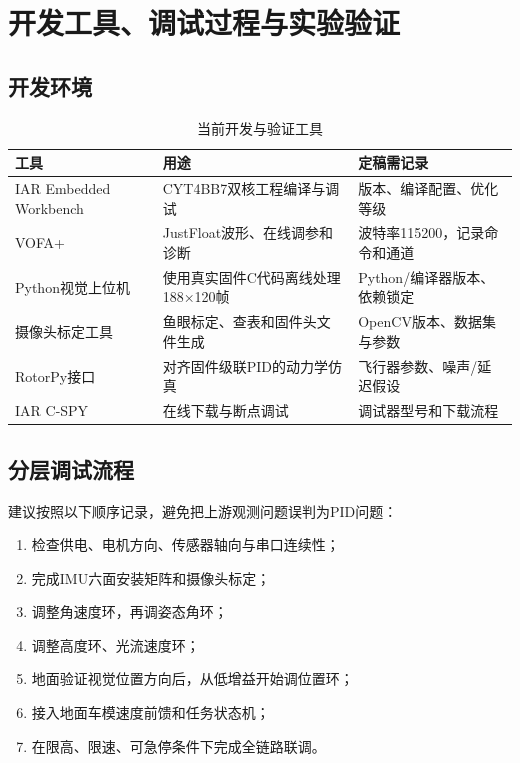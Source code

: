 \chapter{开发工具、调试过程与实验验证}

\section{开发环境}

\begin{table}[htbp]
  \centering
  \caption{当前开发与验证工具}
  \begin{tabularx}{\textwidth}{p{3.2cm}p{4.1cm}X}
    \toprule
    工具 & 用途 & 定稿需记录 \\
    \midrule
    IAR Embedded Workbench & CYT4BB7双核工程编译与调试 & 版本、编译配置、优化等级 \\
    VOFA+ & JustFloat波形、在线调参和诊断 & 波特率115200，记录命令和通道 \\
    Python视觉上位机 & 使用真实固件C代码离线处理188×120帧 & Python/编译器版本、依赖锁定 \\
    摄像头标定工具 & 鱼眼标定、查表和固件头文件生成 & OpenCV版本、数据集与参数 \\
    RotorPy接口 & 对齐固件级联PID的动力学仿真 & 飞行器参数、噪声/延迟假设 \\
    IAR C-SPY & 在线下载与断点调试 & 调试器型号和下载流程 \\
    \bottomrule
  \end{tabularx}
\end{table}

\section{分层调试流程}

建议按照以下顺序记录，避免把上游观测问题误判为PID问题：
\begin{enumerate}
  \item 检查供电、电机方向、传感器轴向与串口连续性；
  \item 完成IMU六面安装矩阵和摄像头标定；
  \item 调整角速度环，再调姿态角环；
  \item 调整高度环、光流速度环；
  \item 地面验证视觉位置方向后，从低增益开始调位置环；
  \item 接入地面车模速度前馈和任务状态机；
  \item 在限高、限速、可急停条件下完成全链路联调。
\end{enumerate}

